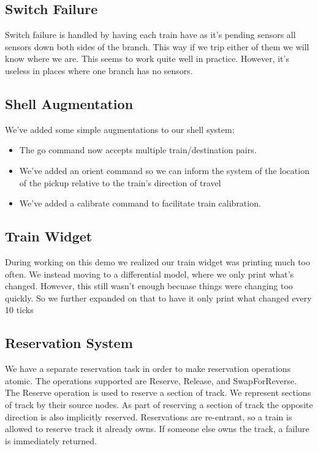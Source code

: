 \documentclass{article}
\begin{document}
\subsection{Switch Failure}

Switch failure is handled by having each train have as it's pending sensors all sensors down both sides of the branch. This way if we trip either of them we will know where we are. This seems to work quite well in practice. However, it's useless in places where one branch has no sensors.

\subsection{Shell Augmentation}

We've added some simple augmentations to our shell system:
\begin{itemize}
  \item The go command now accepts multiple train/destination pairs.
  \item We've added an orient command so we can inform the system of the location of the pickup relative to the train's direction of travel
  \item We've added a calibrate command to facilitate train calibration.
\end{itemize}

\subsection{Train Widget}

During working on this demo we realized our train widget was printing much too often. We instead moving to a differential model, where we only print what's changed. However, this still wasn't enough becuase things were changing too quickly. So we further expanded on that to have it only print what changed every 10 ticks

\subsection{Reservation System}

We have a separate reservation task in order to make reservation operations atomic. The operations supported are Reserve, Release, and SwapForReverse. The Reserve operation is used to reserve a section of track. We represent sections of track by their source nodes. As part of reserving a section of track the opposite direction is also implicitly reserved. Reservations are re-entrant, so a train is allowed to reserve track it already owns. If someone else owns the track, a failure is immediately returned.
\end{document}
